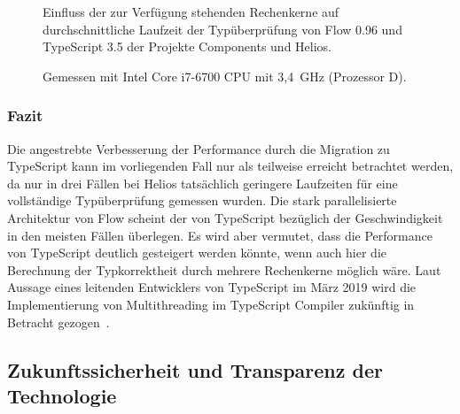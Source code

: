 \begin{figure}[tbp]
  \centering

  

  \vspace{.5\baselineskip}

  
  \vspace{.5\baselineskip}
  \caption[Einfluss der zur Verfügung stehenden Rechenkerne auf durchschnittliche Laufzeit der Typüberprüfung von Flow und TypeScript]{
    Einfluss der zur Verfügung stehenden Rechenkerne auf durchschnittliche Laufzeit der Typüberprüfung von Flow 0.96 und TypeScript 3.5 der Projekte Components und Helios.
  }

  \vspace{\baselineskip}
  \caption*{
    \small
    Gemessen mit Intel Core i7-6700 CPU mit 3,4~GHz (Prozessor D).
  }

  \label{fig:plot-cores}
\end{figure}

\medbreak


\subsubsection{Fazit}

Die angestrebte Verbesserung der Performance durch die Migration zu TypeScript kann im vorliegenden Fall nur als teilweise erreicht betrachtet werden, da nur in drei Fällen bei Helios tatsächlich geringere Laufzeiten für eine vollständige Typüberprüfung gemessen wurden. Die stark parallelisierte Architektur von Flow scheint der von TypeScript bezüglich der Geschwindigkeit in den meisten Fällen überlegen. Es wird aber vermutet, dass die Performance von TypeScript deutlich gesteigert werden könnte, wenn auch hier die Berechnung der Typkorrektheit durch mehrere Rechenkerne möglich wäre. Laut Aussage eines leitenden Entwicklers von TypeScript im März 2019 wird die Implementierung von Multithreading im TypeScript Compiler zukünftig in Betracht gezogen~\autocite{TS:MULTICORE}.

\subsection{Zukunftssicherheit und Transparenz der Technologie}

